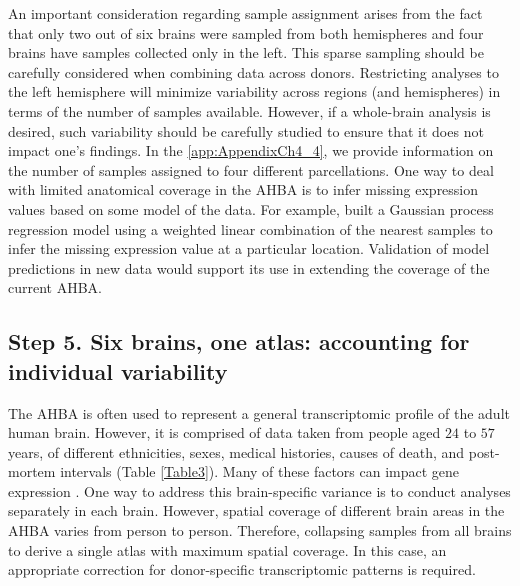 An important consideration regarding sample assignment arises from the fact that only two out of six brains were sampled from both hemispheres and four brains have samples collected only in the left. This sparse sampling should be carefully considered when combining data across donors. Restricting analyses to the left hemisphere will minimize variability across regions (and hemispheres) in terms of the number of samples available. However, if a whole-brain analysis is desired, such variability should be carefully studied to ensure that it does not impact one’s findings. In the \ref{app:AppendixCh4_4}, we provide information on the number of samples assigned to four different parcellations. One way to deal with limited anatomical coverage in the AHBA is to infer missing expression values based on some model of the data. For example, \citet{Gryglewski2018} built a Gaussian process regression model using a weighted linear combination of the nearest samples to infer the missing expression value at a particular location. Validation of model predictions in new data would support its use in extending the coverage of the current AHBA.

\subsection*{Step 5. Six brains, one atlas: accounting for individual variability}

The AHBA is often used to represent a general transcriptomic profile of the adult human brain. However, it is comprised of data taken from people aged $24$ to $57$ years, of different ethnicities, sexes, medical histories, causes of death, and post-mortem intervals (Table \ref{Table3}). Many of these factors can impact gene expression \citep{Fraser2005,Berchtold2008,Kumar2013,Trabzuni2013}. One way to address this brain-specific variance is to conduct analyses separately in each brain. However, spatial coverage of different brain areas in the AHBA varies from person to person. Therefore, collapsing samples from all brains to derive a single atlas with maximum spatial coverage. In this case, an appropriate correction for donor-specific transcriptomic patterns is required.


